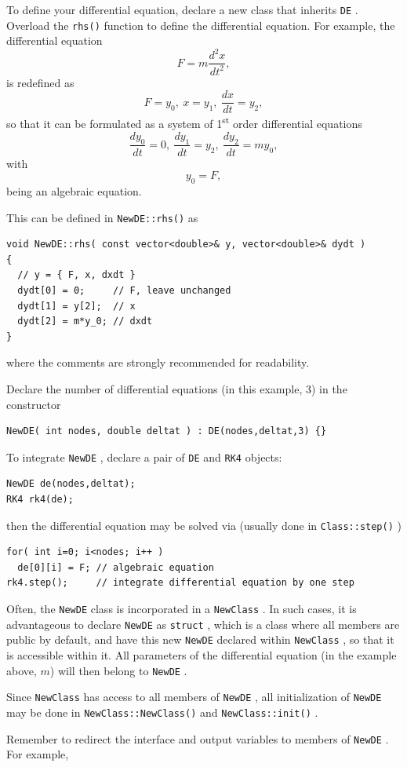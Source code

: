 \documentclass[12pt,a4paper]{article}
\newcommand{\type}[1]{{\small\small\tt #1} }
\begin{document}
To define your differential equation, declare a new class that inherits \type{DE}. Overload the \type{rhs()} function to define the differential equation. For example, the differential equation
\[
    F = m\frac{d^2x}{dt^2},
\]
is redefined as
\[
F = y_0,~x = y_1,~\frac{dx}{dt} = y_2,
\]
so that it can be formulated as a system of 1\textsuperscript{st} order differential equations
\[
    \frac{dy_0}{dt} = 0,~
    \frac{dy_1}{dt} = y_2,~
    \frac{dy_2}{dt} = my_0,
\]
with
\[
    y_0 = F,
\]
being an algebraic equation.

This can be defined in \type{NewDE::rhs()} as
\begin{lstlisting}
void NewDE::rhs( const vector<double>& y, vector<double>& dydt )
{
  // y = { F, x, dxdt }
  dydt[0] = 0;     // F, leave unchanged
  dydt[1] = y[2];  // x
  dydt[2] = m*y_0; // dxdt
}
\end{lstlisting}
where the comments are strongly recommended for readability.

Declare the number of differential equations (in this example, 3) in the constructor
\begin{lstlisting}
NewDE( int nodes, double deltat ) : DE(nodes,deltat,3) {}
\end{lstlisting}

To integrate \type{NewDE}, declare a pair of \type{DE} and \type{RK4} objects:
\begin{lstlisting}
NewDE de(nodes,deltat);
RK4 rk4(de);
\end{lstlisting}
then the differential equation may be solved via (usually done in \type{Class::step()})
\begin{lstlisting}
for( int i=0; i<nodes; i++ )
  de[0][i] = F; // algebraic equation
rk4.step();     // integrate differential equation by one step
\end{lstlisting}

Often, the \type{NewDE} class is incorporated in a \type{NewClass}. In such cases, it is advantageous to declare \type{NewDE} as \type{struct}, which is a class where all members are public by default, and have this new \type{NewDE} declared within \type{NewClass}, so that it is accessible within it. All parameters of the differential equation (in the example above, $m$) will then belong to \type{NewDE}.

Since \type{NewClass} has access to all members of \type{NewDE}, all initialization of \type{NewDE} may be done in \type{NewClass::NewClass()} and \type{NewClass::init()}.

Remember to redirect the interface and output variables to members of \type{NewDE}. For example,
\end{document}
